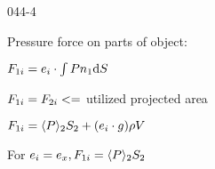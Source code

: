 \begin{mitframe}{044-4}
\begin{listone}
		\item Pressure force on parts of object:
        	\begin{listtwo}
            	\item $\force_{1\state}=\e_{\state}\cdot\int\nolimits\p{n_1}\mathrm{d}\entropy$
                \item $\force_{1\state}=\force_{2\state}<=$ utilized projected area
                \item $\force_{1\state}=\langle\p\rangle_2\entropy_2+(\e_{\state}\cdot\grav)\dens\vol$
                \item For $\e_{\state}=\e_{\disp},\force_{1\state}=\langle\p\rangle_2\entropy_2$
            \end{listtwo}
\end{listone}        
\end{mitframe}